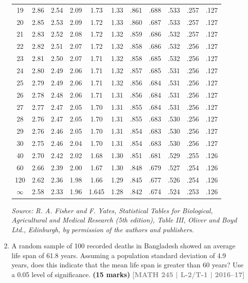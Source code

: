 \documentclass[12pt,a4paper]{article}
\newcommand{\yr}[1]{\hfill\textcolor{gray}{\small\textbf{[#1]}}}
\newcommand{\mk}[1]{\textcolor{orange!70!black}{\small\textbf{(#1 marks)}}}
\begin{document}
\begin{enumerate}
\begin{center}
\begin{longtable}{c | ccccc | ccccc}
19 & 2.86 & 2.54 & 2.09 & 1.73 & 1.33 & .861 & .688 & .533 & .257 & .127 \\
20 & 2.85 & 2.53 & 2.09 & 1.72 & 1.33 & .860 & .687 & .533 & .257 & .127 \\
21 & 2.83 & 2.52 & 2.08 & 1.72 & 1.32 & .859 & .686 & .532 & .257 & .127 \\
22 & 2.82 & 2.51 & 2.07 & 1.72 & 1.32 & .858 & .686 & .532 & .256 & .127 \\
23 & 2.81 & 2.50 & 2.07 & 1.71 & 1.32 & .858 & .685 & .532 & .256 & .127 \\
24 & 2.80 & 2.49 & 2.06 & 1.71 & 1.32 & .857 & .685 & .531 & .256 & .127 \\
25 & 2.79 & 2.49 & 2.06 & 1.71 & 1.32 & .856 & .684 & .531 & .256 & .127 \\
26 & 2.78 & 2.48 & 2.06 & 1.71 & 1.31 & .856 & .684 & .531 & .256 & .127 \\
27 & 2.77 & 2.47 & 2.05 & 1.70 & 1.31 & .855 & .684 & .531 & .256 & .127 \\
28 & 2.76 & 2.47 & 2.05 & 1.70 & 1.31 & .855 & .683 & .530 & .256 & .127 \\
29 & 2.76 & 2.46 & 2.05 & 1.70 & 1.31 & .854 & .683 & .530 & .256 & .127 \\
30 & 2.75 & 2.46 & 2.04 & 1.70 & 1.31 & .854 & .683 & .530 & .256 & .127 \\
40 & 2.70 & 2.42 & 2.02 & 1.68 & 1.30 & .851 & .681 & .529 & .255 & .126 \\
60 & 2.66 & 2.39 & 2.00 & 1.67 & 1.30 & .848 & .679 & .527 & .254 & .126 \\
120 & 2.62 & 2.36 & 1.98 & 1.66 & 1.29 & .845 & .677 & .526 & .254 & .126 \\
$\infty$ & 2.58 & 2.33 & 1.96 & 1.645 & 1.28 & .842 & .674 & .524 & .253 & .126 \\
\end{longtable}

\vspace{0.5cm}
\small{\textit{Source: R. A. Fisher and F. Yates, Statistical Tables for Biological, Agricultural and Medical Research (5th edition), Table III, Oliver and Boyd Ltd., Edinburgh, by permission of the authors and publishers.}}
\end{center}


\item A random sample of 100 recorded deaths in Bangladesh showed an average life span of 61.8 years. Assuming a population standard deviation of 4.9 years, does this indicate that the mean life span is greater than 60 years? Use a 0.05 level of significance.
\mk{15} \yr{MATH 245 | L-2/T-1 | 2016--17}



\end{enumerate}
\end{document}
